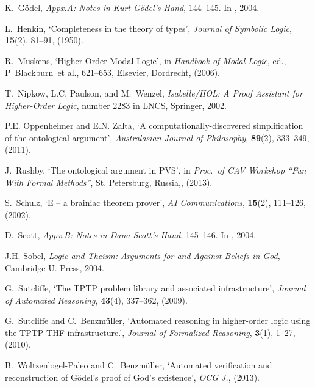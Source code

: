 \documentclass{birkjour}
\theoremstyle{definition}
\theoremstyle{remark}
\numberwithin{equation}{section}
\begin{document}
\begin{thebibliography}{1}
K.~G\"odel, {\em Appx.A: Notes in Kurt G\"odel's Hand},  144--145.
\newblock In  \cite{sobel2004logic}, 2004.

L.~Henkin, `Completeness in the theory of types', {\em Journal of Symbolic
  Logic}, {\bf 15}(2),  81--91, (1950).

R.~Muskens, `{Higher Order Modal Logic}', in {\em Handbook of Modal Logic},
  ed., P~Blackburn~et al.,  621--653, Elsevier, Dordrecht, (2006).

T.~Nipkow, L.C. Paulson, and M.~Wenzel, {\em {Isabelle/HOL: A Proof Assistant
  for Higher-Order Logic}}, number 2283 in LNCS, Springer, 2002.

P.E. Oppenheimer and E.N. Zalta, `A computationally-discovered simplification
  of the ontological argument', {\em Australasian Journal of Philosophy}, {\bf
  89}(2),  333--349, (2011).

J.~Rushby, `The ontological argument in {PVS}', in {\em Proc.~of CAV Workshop
  ``Fun With Formal Methods''}, St. Petersburg, Russia,, (2013).

S.~Schulz, `E -- a brainiac theorem prover', {\em {AI Communications}}, {\bf
  15}(2),  111--126, (2002).

D.~Scott, {\em Appx.B: Notes in Dana Scott's Hand},  145--146.
\newblock In  \cite{sobel2004logic}, 2004.

J.H. Sobel, {\em Logic and Theism: Arguments for and Against Beliefs in God},
  Cambridge U. Press, 2004.

G.~Sutcliffe, `The {TPTP} problem library and associated infrastructure', {\em
  Journal of Automated Reasoning}, {\bf 43}(4),  337--362, (2009).

G.~Sutcliffe and C.~Benzm{\"u}ller, `Automated reasoning in higher-order logic
  using the {TPTP THF} infrastructure.', {\em Journal of Formalized Reasoning},
  {\bf 3}(1),  1--27, (2010).

B.~Woltzenlogel-Paleo and C.~Benzm{\"u}ller, `Automated verification and
  reconstruction of {G\"odel's} proof of {God's} existence', {\em OCG J.},
  (2013).

\end{thebibliography}
\end{document}
